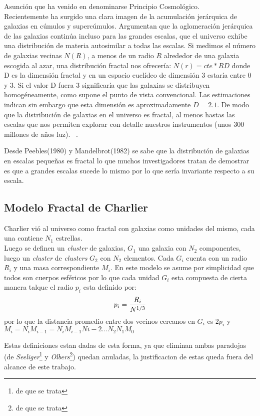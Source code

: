 \documentclass[12tp]{article}
\begin{document}
Asunción que ha venido en denominarse Principio Cosmológico.~\cite{fractals}\\[0.2cm]
Recientemente ha surgido una clara imagen de la acumulación jerárquica de galaxias en cúmulos y supercúmulos.
Argumentan que la aglomeración jerárquica de las galaxias continúa incluso para las grandes escalas, que el universo 
exhibe una distribución de materia autosimilar a todas las escalas. Si medimos el número de galaxias vecinas $N(R)$, a menos de un radio $R$ 
alrededor de una galaxia escogida al azar, una distribución fractal nos ofrecería:
$N(r) = cte * RD$
donde D es la dimensión fractal y en un espacio euclídeo de dimensión 3 estaría entre 0 y 3. Si el valor D fuera 3 significaría que las 
galaxias se distribuyen homogéneamente, como supone el punto de vista convencional. Las estimaciones indican sin embargo que esta 
dimensión es aproximadamente $D = 2.1$. De modo que la distribución de galaxias en el universo es fractal, al menos hastas las escalas que 
nos permiten explorar con detalle nuestros instrumentos (unos 300 millones de años luz). ~\cite{fractals}.

Desde Peebles(1980) y Mandelbrot(1982) se sabe que la distribución de galaxias en escalas pequeñas es fractal lo que muchos investigadores tratan de 
demostrar es que a grandes escalas sucede lo mismo por lo que sería invariante respecto a su escala.

\subsection{Modelo Fractal de Charlier}
Charlier vió al universo como fractal con galaxias como unidades del mismo, cada una contiene $N_1$ estrellas.\\
Luego se definen un \emph{cluster} de galaxias, $G_1$ una galaxia con $N_2$ componentes, luego un \emph{cluster} de \emph{clusters}
$G_2$ con $N_2$ elementos. Cada $G_i$ cuenta con un radio $R_i$ y una masa correspondiente $M_i$.
En este modelo se asume por simplicidad que todos son cuerpos esféricos por lo que cada unidad $G_i$ esta compuesta de
cierta manera talque el radio $p_i$ esta definido por:
\begin{equation}
    p_i= {{R_i }\over{N^{1/3}}}
\end{equation}
por lo que la distancia promedio entre dos vecinos cercanos en $G_i$ es $2p_i$ y $M_i=N_iM_{i-1}= N_iM_{i-1}N{i-2}...N_2N_1M_0$

Estas definiciones estan dadas de esta forma, ya que eliminan ambas paradojas (de \emph{Seeliger}\footnote{de que se trata} y \emph{Olbers}\footnote{de que se trata}) quedan 
anuladas, la justificacion de estas queda fuera del alcance de este trabajo.
\end{document}
